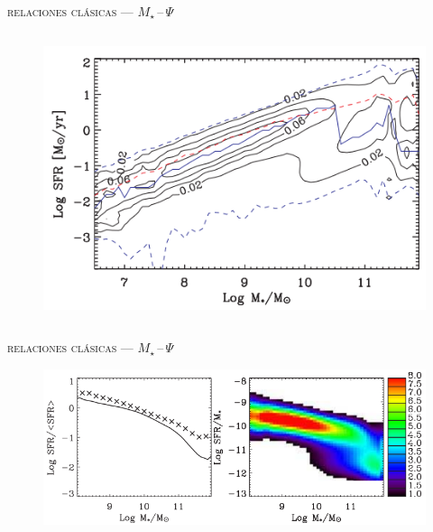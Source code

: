 \documentclass[xcolor=dvipsnames,4pt,hyperref={colorlinks,citecolor=black,linkcolor=black,urlcolor=black}]{beamer}
\begin{document}
\begin{frame}{\textsc{relaciones clásicas --- $M_\star\,$--$\,\Psi$}}

\begin{columns}
\begin{figure}
\includegraphics[scale=1]{img/brinchmann2004-17}
\end{figure}
\end{columns}
\end{frame}

\begin{frame}{\textsc{relaciones clásicas --- $M_\star\,$--$\,\Psi$}}
\begin{figure}
\includegraphics[scale=1]{img/brinchmann2004-24}
\end{figure}
\end{frame}
\end{document}
